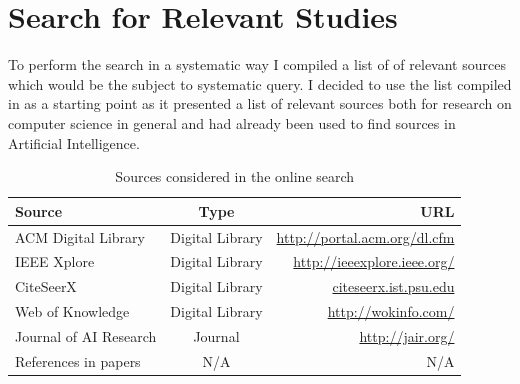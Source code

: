 \documentclass[a4paper]{book}
\begin{document}


\section{Search for Relevant Studies}

To perform the search in a systematic way I compiled a list of of relevant sources which would be the subject to systematic query. I decided to use the list compiled in \cite{Lillegraven_design_2010} as a starting point as it presented a list of relevant sources both for research on computer science in general and had already been used to find sources in Artificial Intelligence. 


\begin{table}[htdp]
\begin{center}
\begin{tabular}{|l|c|r|}\hline
Source                  &   Type                        & URL \\ \hline \hline
ACM Digital Library     &   Digital Library             & \url{http://portal.acm.org/dl.cfm} \\  \hline %
IEEE Xplore             &   Digital Library             & \url{http://ieeexplore.ieee.org/} \\ \hline   %
CiteSeerX               &   Digital Library             & \url{citeseerx.ist.psu.edu} \\ \hline         %
Web of Knowledge        &   Digital Library             & \url{http://wokinfo.com/} \\ \hline           %
Journal of AI Research   &   Journal                     & \url{http://jair.org/} \\  \hline      %
References in papers    &   N/A                         & N/A \\\hline\hline
\end{tabular}
\end{center}
\label{table:sources}
\caption{Sources considered in the online search}
\end{table}
\end{document}
